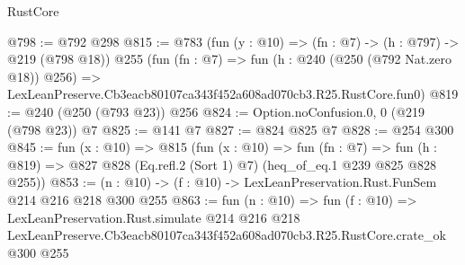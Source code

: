 \begin{lexlean}{RustCore}
\begin{coremodule}
@798 := @792 @298
@815 := @783
    (fun (y : @10) => (fn : @7) -> (h : @797) -> @219 (@798 @18))
    @255
    (fun (fn : @7) =>
    fun (h : @240 (@250 (@792 Nat.zero @18)) @256) =>
    LexLeanPreserve.Cb3eacb80107ca343f452a608ad070cb3.R25.RustCore.fun0)
@819 := @240 (@250 (@793 @23)) @256
@824 := Option.noConfusion.{0, 0} (@219 (@798 @23)) @7
@825 := @141 @7
@827 := @824 @825 @7
@828 := @254 @300
@845 := fun (x : @10) =>
  @815
    (fun (x : @10) =>
    fun (fn : @7) =>
    fun (h : @819) => @827 @828 (Eq.refl.{2} (Sort 1) @7) (heq_of_eq.{1} @239 @825 @828 @255))
@853 := (n : @10) -> (f : @10) -> LexLeanPreservation.Rust.FunSem @214 @216 @218 @300 @255
@863 := fun (n : @10) =>
  fun (f : @10) =>
  LexLeanPreservation.Rust.simulate
    @214
    @216
    @218
    LexLeanPreserve.Cb3eacb80107ca343f452a608ad070cb3.R25.RustCore.crate_ok
    @300
    @255
\end{coremodule}
\end{lexlean}
